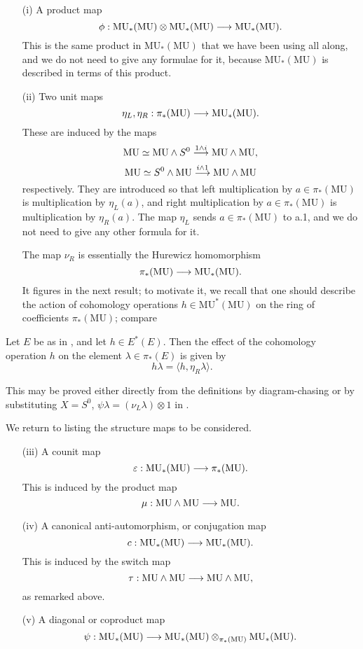 \documentclass[../main]{subfiles}
\begin{document}
\begin{enumerate}
    \item[(i)] A product map $$\phi : \mathrm{MU}_\ast(\mathrm{MU}) \otimes \mathrm{MU}_\ast(\mathrm{MU}) \overset{}{\longrightarrow} \mathrm{MU}_\ast(\mathrm{MU}).$$ This is the same product in $\mathrm{MU}_\ast(\mathrm{MU})$ that we have been using all along, and we do not need to give any formulae for it, because $\mathrm{MU}_\ast(\mathrm{MU})$ is described in terms of this product.
    \item[(ii)] Two unit maps $$\eta_L, \eta_R : \pi_\ast(\mathrm{MU}) \overset{}{\longrightarrow} \mathrm{MU}_\ast(\mathrm{MU}).$$ These are induced by the maps 
    $$\mathrm{MU} \simeq \mathrm{MU} \wedge S^0 \overset{1 \wedge i}{\longrightarrow} \mathrm{MU} \wedge \mathrm{MU},$$
    $$\mathrm{MU} \simeq S^0 \wedge \mathrm{MU} \overset{i \wedge 1}{\longrightarrow} \mathrm{MU} \wedge \mathrm{MU}$$
    respectively. They are introduced so that left multiplication by $a \in \pi_\ast(\mathrm{MU})$ is multiplication by $\eta_L(a)$, and right multiplication by $a \in \pi_\ast(\mathrm{MU})$ is multiplication by $\eta_R(a)$. The map $\eta_L$ sends $a \in \pi_\ast(\mathrm{MU})$ to a.1, and we do not need to give any other formula for it.

    The map $\nu_R$ is essentially the Hurewicz homomorphism $$\pi_\ast(\mathrm{MU}) \overset{}{\longrightarrow} \mathrm{MU}_\ast(\mathrm{MU}).$$ It figures in the next result; to motivate it, we recall that one should describe the action of cohomology operations $h \in \mathrm{MU}^\ast(\mathrm{MU})$ on the ring of coefficients $\pi_\ast(\mathrm{MU})$; compare \cite[p.~19; Theorem 8.1, p.~23]{adams2}
\end{enumerate}

\begin{proposition}
\label{prop:p2c11.2}
Let $E$ be as in \cite[Lecture 3]{adams3}, and let $h \in E^\ast(E)$. Then the effect of the cohomology operation $h$ on the element $\lambda \in \pi_\ast(E)$ is given by $$h \lambda = \langle h, \eta_R \lambda\rangle.$$
\end{proposition}

This may be proved either directly from the definitions by diagram-chasing or by substituting $X = S^0$, $\psi \lambda = (\nu_L \lambda) \otimes 1$ in \cite[Proposition 2, p.~75]{adams3}.

We return to listing the structure maps to be considered.

\begin{enumerate}
    \item[(iii)] A counit map $$\varepsilon : \mathrm{MU}_\ast(\mathrm{MU}) \overset{}{\longrightarrow} \pi_\ast(\mathrm{MU}).$$ This is induced by the product map $$\mu : \mathrm{MU} \wedge \mathrm{MU} \overset{}{\longrightarrow} \mathrm{MU}.$$
    \item[(iv)] A canonical anti-automorphism, or conjugation map $$c : \mathrm{MU}_\ast(\mathrm{MU}) \overset{}{\longrightarrow} \mathrm{MU}_\ast(\mathrm{MU}).$$ This is induced by the switch map $$\tau : \mathrm{MU} \wedge \mathrm{MU} \overset{}{\longrightarrow} \mathrm{MU} \wedge \mathrm{MU},$$ as remarked above. 
    \item[(v)] A diagonal or coproduct map $$\psi : \mathrm{MU}_\ast(\mathrm{MU}) \overset{}{\longrightarrow} \mathrm{MU}_\ast (\mathrm{MU}) \otimes_{\pi_\ast(\mathrm{MU})} \mathrm{MU}_\ast(\mathrm{MU}).$$
\end{enumerate}
\end{document}
